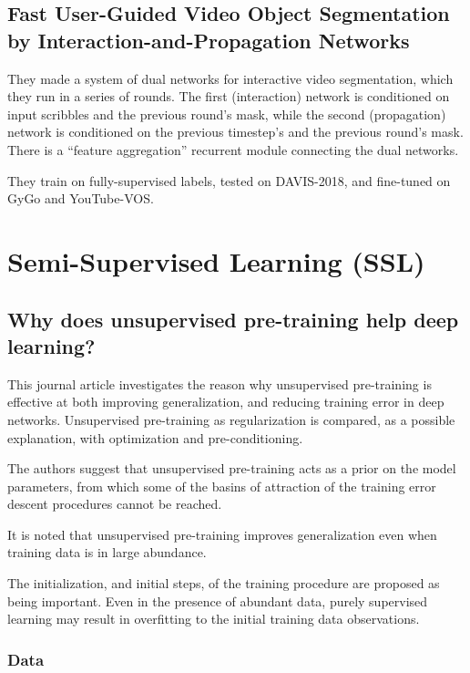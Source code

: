 \documentclass[a4paper, 12pt]{article}
\begin{document}
\subsection{Fast User-Guided Video Object Segmentation by
            Interaction-and-Propagation Networks~\cite{oh2019fast}}

They made a system of dual networks for interactive video segmentation, which
they run in a series of rounds. The first (interaction) network is conditioned
on input scribbles and the previous round's mask, while the second
(propagation) network is conditioned on the previous timestep's and the
previous round's mask. There is a ``feature aggregation'' recurrent module
connecting the dual networks.

They train on fully-supervised labels, tested on DAVIS-2018, and fine-tuned on
GyGo and YouTube-VOS\@.


\section{Semi-Supervised Learning (SSL)}

\subsection{Why does unsupervised pre-training help deep
            learning?~\citet{Erhan:2010:WUP:1756006.1756025}}

This journal article investigates the reason why unsupervised pre-training is
effective at both improving generalization, and reducing training error in deep
networks. Unsupervised pre-training as regularization is compared, as a possible
explanation, with optimization and pre-conditioning.

The authors suggest that unsupervised pre-training acts as a prior on the model
parameters, from which some of the basins of attraction of the training error
descent procedures cannot be reached.

It is noted that unsupervised pre-training improves generalization even when
training data is in large abundance.

The initialization, and initial steps, of the training procedure are proposed
as being important. Even in the presence of abundant data, purely supervised
learning may result in overfitting to the initial training data observations.


\subsubsection{Data}
\end{document}
